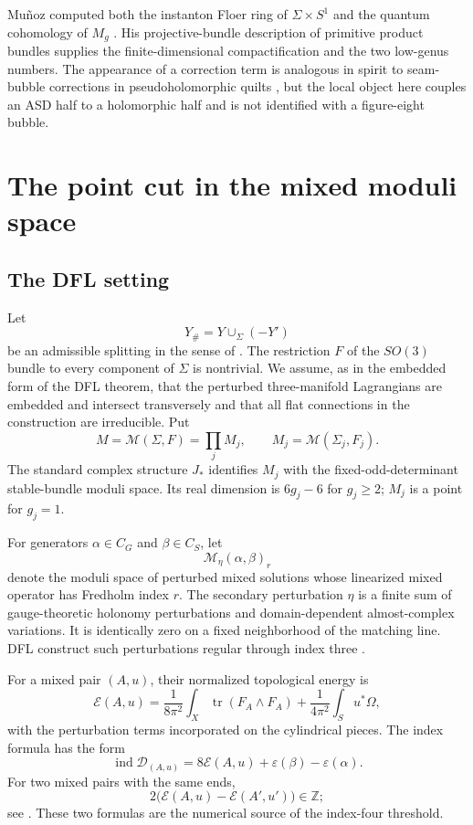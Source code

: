 \documentclass[11pt]{amsart}
\theoremstyle{definition}
\theoremstyle{remark}
\theoremstyle{plain}
\newcommand{\ZZ}{\mathbb{Z}}
\newcommand{\cD}{\mathcal{D}}
\newcommand{\cE}{\mathcal{E}}
\newcommand{\cM}{\mathcal{M}}
\newcommand{\ind}{\operatorname{ind}}
\newcommand{\tr}{\operatorname{tr}}
\begin{document}
Mu\~noz computed both the instanton Floer ring of $\Sigma\times S^1$ and
the quantum cohomology of $M_g$ \cite{Munoz99a,Munoz99b}.  His
projective-bundle description of primitive product bundles supplies the
finite-dimensional compactification and the two low-genus numbers.  The
appearance of a correction term is analogous in spirit to seam-bubble
corrections in pseudoholomorphic quilts \cite{BottmanWehrheim18}, but the
local object here couples an ASD half to a holomorphic half and is not
identified with a figure-eight bubble.

\section{The point cut in the mixed moduli space}
\label{sec:point-cut}

\subsection{The DFL setting}\label{sec:dfl-setting}
Let
\[
                      Y_\#=Y\cup_\Sigma(-Y')
\]
be an admissible splitting in the sense of
\cite[Sections~2--3]{DaeFukLip21a}.  The restriction $F$ of the
$SO(3)$ bundle to every component of $\Sigma$ is nontrivial.  We assume,
as in the embedded form of the DFL theorem, that the perturbed
three-manifold Lagrangians are embedded and intersect transversely and that
all flat connections in the construction are irreducible.  Put
\[
 M=\cM(\Sigma,F)=\prod_jM_j,
 \qquad M_j=\cM(\Sigma_j,F_j).
\]
The standard complex structure $J_*$ identifies $M_j$ with the
fixed-odd-determinant stable-bundle moduli space.  Its real dimension is
$6g_j-6$ for $g_j\geq2$; $M_j$ is a point for $g_j=1$.

For generators $\alpha\in C_G$ and $\beta\in C_S$, let
\[
                         \cM_\eta(\alpha,\beta)_r
\]
denote the moduli space of perturbed mixed solutions whose linearized
mixed operator has Fredholm index $r$.  The secondary perturbation $\eta$
is a finite sum of gauge-theoretic holonomy perturbations and
domain-dependent almost-complex variations.  It is identically zero on a
fixed neighborhood of the matching line.  DFL construct such
perturbations regular through index three
\cite[Proposition~3.23]{DaeFukLip21a}.

For a mixed pair $(A,u)$, their normalized topological energy is
\begin{equation}\label{eq:top-energy}
 \cE(A,u)=\frac1{8\pi^2}\int_X\tr(F_A\wedge F_A)
          +\frac1{4\pi^2}\int_Su^*\Omega,
\end{equation}
with the perturbation terms incorporated on the cylindrical pieces.  The
index formula has the form
\begin{equation}\label{eq:index-energy}
 \ind\cD_{(A,u)}
 =8\cE(A,u)+\varepsilon(\beta)-\varepsilon(\alpha).
\end{equation}
For two mixed pairs with the same ends,
\begin{equation}\label{eq:half-integrality}
 2\bigl(\cE(A,u)-\cE(A',u')\bigr)\in\ZZ;
\end{equation}
see \cite[Lemma~3.15]{DaeFukLip21a}.  These two formulas are the
numerical source of the index-four threshold.
\end{document}
